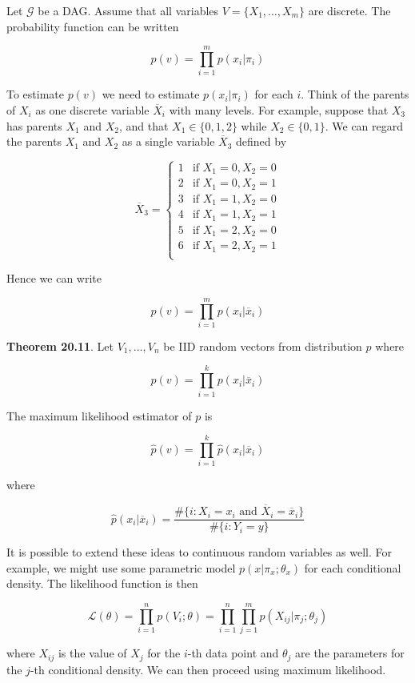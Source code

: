 Let \(\mathcal{G}\) be a DAG. Assume that all variables
\(V = \{ X_1, \dots, X_m \}\) are discrete. The probability function can
be written

\[ p(v) = \prod_{i=1}^m p(x_i | \pi_i) \]

To estimate \(p(v)\) we need to estimate \(p(x_i | \pi_i)\) for each
\(i\). Think of the parents of \(X_i\) as one discrete variable
\(\overline{X}_i\) with many levels. For example, suppose that \(X_3\)
has parents \(X_1\) and \(X_2\), and that \(X_1 \in \{ 0, 1, 2 \}\)
while \(X_2 \in \{ 0, 1 \}\). We can regard the parents \(X_1\) and
\(X_2\) as a single variable \(\overline{X}_3\) defined by

\[ \overline{X}_3 = \begin{cases}
1 & \text{if } X_1 = 0, X_2 = 0\\
2 & \text{if } X_1 = 0, X_2 = 1\\
3 & \text{if } X_1 = 1, X_2 = 0\\
4 & \text{if } X_1 = 1, X_2 = 1\\
5 & \text{if } X_1 = 2, X_2 = 0\\
6 & \text{if } X_1 = 2, X_2 = 1\\
\end{cases}\]

Hence we can write

\[ p(v) = \prod_{i=1}^m p(x_i | \overline{x}_i) \]

\textbf{Theorem 20.11}. Let \(V_1, \dots, V_n\) be IID random vectors
from distribution \(p\) where

\[ p(v) = \prod_{i=1}^k p(x_i | \overline{x}_i) \]

The maximum likelihood estimator of \(p\) is

\[ \hat{p}(v) = \prod_{i=1}^k \hat{p}(x_i | \overline{x}_i) \]

where

\[ \hat{p}(x_i | \overline{x}_i) = \frac{\# \{i : X_i = x_i \text{ and } \overline{X}_i = \overline{x}_i \}}{\# \{i : Y_i = y \}} \]

It is possible to extend these ideas to continuous random variables as
well. For example, we might use some parametric model
\(p(x | \pi_x; \theta_x)\) for each conditional density. The likelihood
function is then

\[ \mathcal{L}(\theta) = \prod_{i=1}^n p(V_i; \theta) = \prod_{i=1}^n \prod_{j=1}^m p(X_{ij} | \pi_j; \theta_j) \]

where \(X_{ij}\) is the value of \(X_j\) for the \(i\)-th data point and
\(\theta_j\) are the parameters for the \(j\)-th conditional density. We
can then proceed using maximum likelihood.

